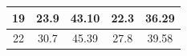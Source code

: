 \documentclass{article}
\begin{document}
\begin{Large}
\begin{table}[h]
\begin{tabular}{|c|cc|cc|}
19                                                                       & \multicolumn{1}{c|}{23.9}                                                    & 43.10                                                       & \multicolumn{1}{c|}{22.3}                                                    & 36.29                                                       \\ \hline
22                                                                       & \multicolumn{1}{c|}{30.7}                                                    & 45.39                                                       & \multicolumn{1}{c|}{27.8}                                                    & 39.58                                                       \\ \hline
\end{tabular}
\end{table}


\end{Large}
\end{document}

